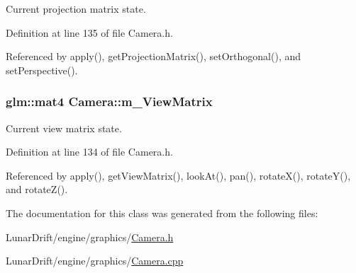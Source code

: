Current projection matrix state. 



Definition at line 135 of file Camera.\+h.



Referenced by apply(), get\+Projection\+Matrix(), set\+Orthogonal(), and set\+Perspective().

\subsubsection[{\texorpdfstring{m\+\_\+\+View\+Matrix}{m_ViewMatrix}}]{\setlength{\rightskip}{0pt plus 5cm}glm\+::mat4 Camera\+::m\+\_\+\+View\+Matrix\hspace{0.3cm}{\ttfamily [private]}}\hypertarget{class_camera_a678ced6db61f473f65734c8a1522ea80}{}\label{class_camera_a678ced6db61f473f65734c8a1522ea80}


Current view matrix state. 



Definition at line 134 of file Camera.\+h.



Referenced by apply(), get\+View\+Matrix(), look\+At(), pan(), rotate\+X(), rotate\+Y(), and rotate\+Z().



The documentation for this class was generated from the following files\+:\begin{DoxyCompactItemize}
\item 
Lunar\+Drift/engine/graphics/\hyperlink{_camera_8h}{Camera.\+h}\item 
Lunar\+Drift/engine/graphics/\hyperlink{_camera_8cpp}{Camera.\+cpp}\end{DoxyCompactItemize}

